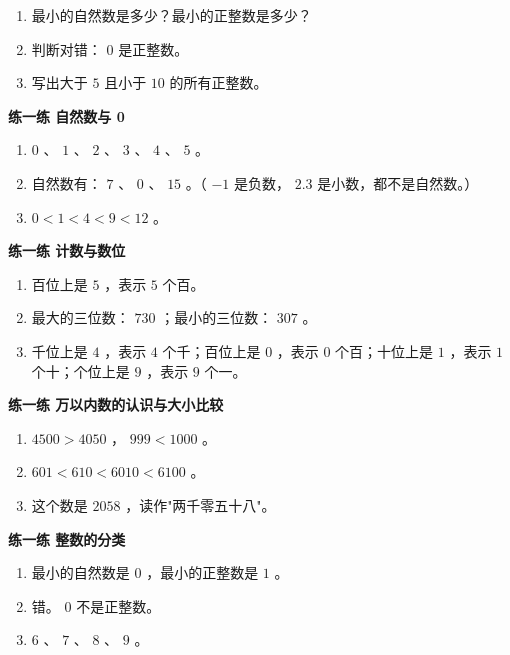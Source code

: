 \begin{practice}


\begin{enumerate}
  \item 最小的自然数是多少？最小的正整数是多少？
  \item 判断对错： $0$ 是正整数。
  \item 写出大于 $5$ 且小于 $10$ 的所有正整数。
\end{enumerate}


\end{practice}



\begin{answer}


\textbf{练一练 自然数与 0}

\begin{enumerate}
  \item $0$ 、 $1$ 、 $2$ 、 $3$ 、 $4$ 、 $5$ 。
  \item 自然数有： $7$ 、 $0$ 、 $15$ 。（ $-1$ 是负数， $2.3$ 是小数，都不是自然数。）
  \item $0 < 1 < 4 < 9 < 12$ 。
\end{enumerate}


\textbf{练一练 计数与数位}

\begin{enumerate}
  \item 百位上是 $5$ ，表示 $5$ 个百。
  \item 最大的三位数： $730$ ；最小的三位数： $307$ 。
  \item 千位上是 $4$ ，表示 $4$ 个千；百位上是 $0$ ，表示 $0$ 个百；十位上是 $1$ ，表示 $1$ 个十；个位上是 $9$ ，表示 $9$ 个一。
\end{enumerate}


\textbf{练一练 万以内数的认识与大小比较}

\begin{enumerate}
  \item $4500 > 4050$ ， $999 < 1000$ 。
  \item $601 < 610 < 6010 < 6100$ 。
  \item 这个数是 $2058$ ，读作"两千零五十八"。
\end{enumerate}


\textbf{练一练 整数的分类}

\begin{enumerate}
  \item 最小的自然数是 $0$ ，最小的正整数是 $1$ 。
  \item 错。 $0$ 不是正整数。
  \item $6$ 、 $7$ 、 $8$ 、 $9$ 。
\end{enumerate}


\end{answer}
